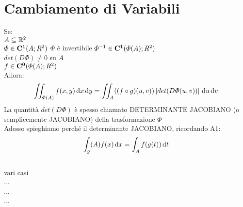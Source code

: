 \section{Cambiamento di Variabili}
Se:\\
$A\subseteq \mathbb{R}^2$\\
$\varPhi\in \mathbf{C^{1}}(A;R^2)$
$\varPhi$ è invertibile
$\varPhi^{-1}\in \mathbf{C^{1}}(\varPhi(A);R^2)$\\
$det(D\varPhi)\ne 0$ su $A$\\
$f\in \mathbf{C^{0}}(\varPhi(A);R^2)$\\
Allora:\\
\[ \iint_{\varPhi(A)}f(x,y)\,\mathrm{d}{x}\,\mathrm{d}{y}=\iint_A((f\circ g)(u,v))\left|det(D\varPhi(u,v))\right|\,\mathrm{d}{u}\,\mathrm{d}{v}\]
La quantità $det(D\varPhi)$ è spesso chiamato DETERMINANTE JACOBIANO (o semplicemente JACOBIANO) della trasformazione $\varPhi$\\
Adesso spieghiamo perché il determinante JACOBIANO, ricordando A1:
\[ \int_g(A)f(x)\,\mathrm{d}{x} = \int_Af(g(t))\,\mathrm{d}{t}\]\\
vari casi\\
...\\
...\\
...\\



